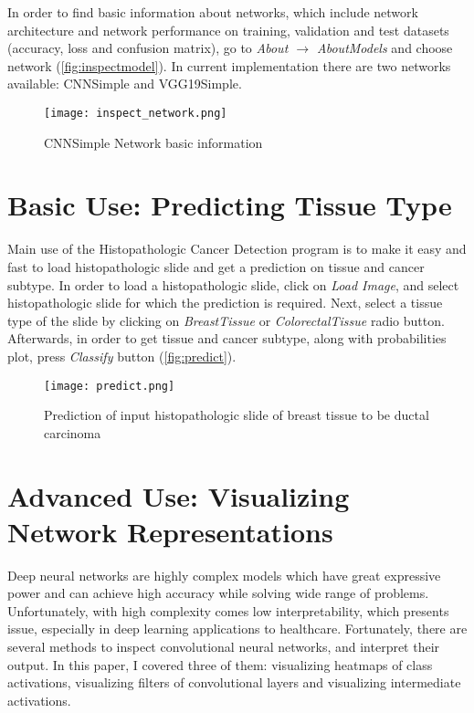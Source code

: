 In order to find basic information about networks, which include network architecture and network performance on training, validation and test datasets (accuracy, loss and confusion matrix), go to \emph{About $\rightarrow$ About\;Models} and choose network (\textcolor{red}{\autoref{fig:inspectmodel}}). In current implementation there are two networks available: CNNSimple and VGG19Simple.
\clearpage

\begin{figure}[h]
	\centering
	\texttt{[image: inspect\_network.png]}
	\caption{CNNSimple Network basic information}
	\label{fig:inspectmodel}
\end{figure}

\section{Basic Use: Predicting Tissue Type}
\label{basicuse}

Main use of the Histopathologic Cancer Detection program is to make it easy and fast to load histopathologic slide and get a prediction on tissue and cancer subtype. In order to load a histopathologic slide, click on \emph{Load\; Image}, and select histopathologic slide for which the prediction is required. Next, select a tissue type of the slide by clicking on \emph{Breast\;Tissue} or \emph{Colorectal\;Tissue} radio button. Afterwards, in order to get tissue and cancer subtype, along with probabilities plot, press \emph{Classify} button (\textcolor{red}{\autoref{fig:predict}}).

\begin{figure}[h]
	\centering
	\texttt{[image: predict.png]}
	\caption{Prediction of input histopathologic slide of breast tissue to be ductal carcinoma}
	\label{fig:predict}
\end{figure}

\section{Advanced Use: Visualizing Network Representations}
\label{advuse}

Deep neural networks are highly complex models which have great expressive power and can achieve high accuracy while solving wide range of problems. Unfortunately, with high complexity comes low interpretability, which presents issue, especially in deep learning applications to healthcare. Fortunately, there are several methods to inspect convolutional neural networks, and interpret their output. In this paper, I covered three of them: visualizing heatmaps of class activations, visualizing filters of convolutional layers and visualizing intermediate activations.

